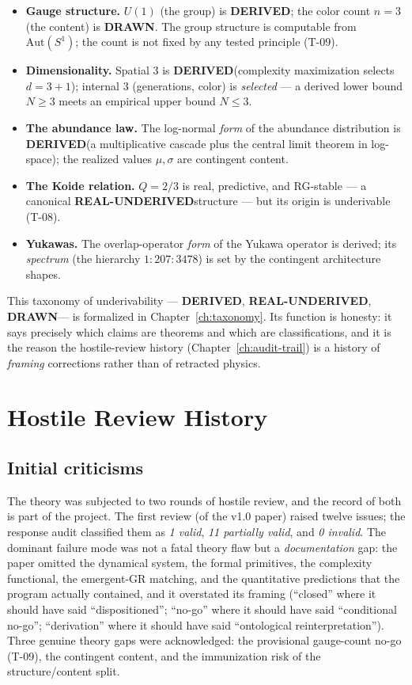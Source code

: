 \documentclass[10pt,twoside,openany]{book}
\newcommand{\derived}{\textbf{DERIVED}}
\newcommand{\realunder}{\textbf{REAL-UNDERIVED}}
\newcommand{\drawn}{\textbf{DRAWN}}
\begin{document}
\begin{itemize}
\item \textbf{Gauge structure.} $U(1)$ (the group) is \derived; the color count $n=3$
(the content) is \drawn. The group structure is computable from $\mathrm{Aut}(S^1)$; the
count is not fixed by any tested principle (T-09).
\item \textbf{Dimensionality.} Spatial $3$ is \derived (complexity maximization selects
$d=3{+}1$); internal $3$ (generations, color) is \emph{selected} --- a derived lower
bound $N\ge3$ meets an empirical upper bound $N\le3$.
\item \textbf{The abundance law.} The log-normal \emph{form} of the abundance
distribution is \derived (a multiplicative cascade plus the central limit theorem in
log-space); the realized values $\mu,\sigma$ are contingent content.
\item \textbf{The Koide relation.} $Q=2/3$ is real, predictive, and RG-stable --- a
canonical \realunder structure --- but its origin is underivable (T-08).
\item \textbf{Yukawas.} The overlap-operator \emph{form} of the Yukawa operator is
derived; its \emph{spectrum} (the hierarchy $1{:}207{:}3478$) is set by the contingent
architecture shapes.
\end{itemize}

This taxonomy of underivability --- \derived, \realunder, \drawn --- is formalized in
Chapter~\ref{ch:taxonomy}. Its function is honesty: it says precisely which claims are
theorems and which are classifications, and it is the reason the hostile-review history
(Chapter~\ref{ch:audit-trail}) is a history of \emph{framing} corrections rather than of
retracted physics.

\chapter{Hostile Review History}
\label{ch:review-history}

\section{Initial criticisms}

The theory was subjected to two rounds of hostile review, and the record of both is part
of the project. The first review (of the v1.0 paper) raised twelve issues; the response
audit classified them as \emph{1 valid}, \emph{11 partially valid}, and \emph{0 invalid}.
The dominant failure mode was not a fatal theory flaw but a \emph{documentation} gap: the
paper omitted the dynamical system, the formal primitives, the complexity functional, the
emergent-GR matching, and the quantitative predictions that the program actually
contained, and it overstated its framing (``closed'' where it should have said
``dispositioned''; ``no-go'' where it should have said ``conditional no-go''; ``derivation''
where it should have said ``ontological reinterpretation''). Three genuine theory gaps were
acknowledged: the provisional gauge-count no-go (T-09), the contingent content, and the
immunization risk of the structure/content split.
\end{document}
